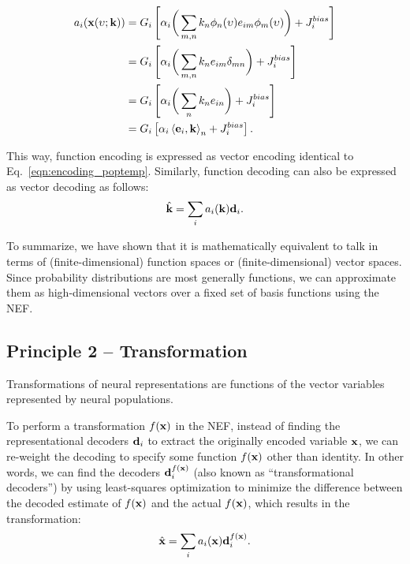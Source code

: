 \documentclass[10pt,letterpaper]{article}
\renewcommand{\vec}[1]{{\bf {#1}}}
\newcommand{\dotp}[3]{\left\langle {#1}, {#2} \right\rangle_{#3}}
\newcommand{\lif}[2]{G_{#1} \left[ {#2} \right]}
\begin{document}
\vspace{-10pt}
\begin{equation}
\label{eqn:final_func_encoding}
\begin{aligned}
a_i(\vec{x}(\upsilon; \vec{k})) & = \lif{i}{\alpha_i\bigg(\sum_{m,n} k_n \phi_n(\upsilon) e_{im} \phi_m(\upsilon)\bigg) +  J_i^{bias}} \\
& = \lif{i}{\alpha_i\bigg(\sum_{m,n} k_n e_{im} \delta_{mn} \bigg) +  J_i^{bias}} \\ 
& = \lif{i}{\alpha_i\bigg(\sum_{n} k_n e_{in} \bigg) +  J_i^{bias}} \\
& = \lif{i}{\alpha_i \dotp{\vec{e}_i}{\vec{k}}{n} +  J_i^{bias}} .
\end{aligned}
\end{equation}


This way, function encoding is expressed as vector encoding identical to Eq.~\ref{eqn:encoding_poptemp}. Similarly, function decoding can also be expressed as vector decoding as follows:
\begin{equation}
\label{eqn:final_func_decoding}
\begin{aligned} 
\hat{\vec{k}} = \sum_i a_i(\vec{k}) \vec{d}_i .
\end{aligned}
\end{equation}

To summarize, we have shown that it is mathematically equivalent to talk in terms of (finite-dimensional) function spaces or (finite-dimensional) vector spaces. Since probability distributions are most generally functions, we can approximate them as high-dimensional vectors over a fixed set of basis functions using the NEF.

\subsection{Principle 2 -- Transformation}
Transformations of neural representations are functions of the vector variables represented by neural populations. 

To perform a transformation $f(\vec{x})$ in the NEF, instead of finding the representational decoders $\vec{d}_i$ to extract the originally encoded variable $\vec{x}$, we can re-weight the decoding to specify some function $f(\vec{x})$ other than identity. In other words, we can find the decoders $\vec{d}_i^{f(\vec{x})}$ (also known as ``transformational decoders'') by using least-squares optimization to minimize the difference between the decoded estimate of $f(\vec{x})$ and the actual $f(\vec{x})$, which results in the transformation:
\begin{equation}
\label{eqn:decoding_transform}
\begin{aligned}
\hat{\vec{x}} = \sum_i a_i(\vec{x})\vec{d}_i^{f(\vec{x})} .
\end{aligned}
\end{equation}
\end{document}

